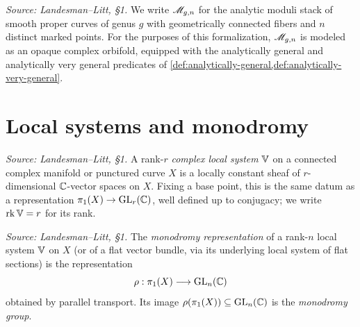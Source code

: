 \begin{definition}
  \label{def:moduli-stack}
  \textit{Source: Landesman--Litt, \S1.}
  We write $\mathscr{M}_{g,n}$ for the analytic moduli stack of smooth proper curves of
  genus $g$ with geometrically connected fibers and $n$ distinct marked points.
  For the purposes of this formalization, $\mathscr{M}_{g,n}$ is modeled as an opaque
  complex orbifold, equipped with the analytically general and analytically very
  general predicates of \cref{def:analytically-general,def:analytically-very-general}.
\end{definition}

\section{Local systems and monodromy}

\begin{definition}
  \label{def:local-system}
  \textit{Source: Landesman--Litt, \S1.}
  A rank-$r$ \emph{complex local system} $\mathbb{V}$ on a connected complex manifold or
  punctured curve $X$ is a locally constant sheaf of $r$-dimensional $\mathbb{C}$-vector
  spaces on $X$. Fixing a base point, this is the same datum as a representation
  $\pi_1(X) \to \operatorname{GL}_r(\mathbb{C})$, well defined up to conjugacy; we write
  $\operatorname{rk} \mathbb{V} = r$ for its rank.
\end{definition}

\begin{definition}
  \label{def:monodromy}
  \textit{Source: Landesman--Litt, \S1.}
  The \emph{monodromy representation} of a rank-$n$ local system $\mathbb{V}$ on $X$ (or
  of a flat vector bundle, via its underlying local system of flat sections) is
  the representation
  \[
    \rho : \pi_1(X) \longrightarrow \operatorname{GL}_n(\mathbb{C})
  \]
  obtained by parallel transport. Its image $\rho(\pi_1(X)) \subseteq \operatorname{GL}_n(\mathbb{C})$
  is the \emph{monodromy group}.
\end{definition}

